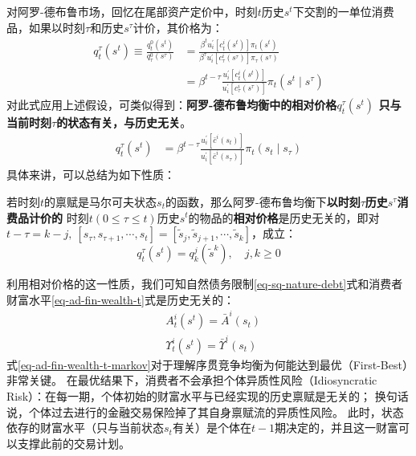 对阿罗-德布鲁市场，回忆在尾部资产定价中，时刻$t$历史$s^t$下交割的一单位消费品，如果以时刻$\tau$和历史$s^{\tau}$计价，其价格为：
\begin{equation*}
    \begin{aligned}
        q_t^\tau\left(s^t\right) 
            \equiv \frac{q_t^0\left(s^t\right)}{q_\tau^0\left(s^\tau\right)} 
            & =\frac{\beta^t u_i^{\prime}\left[c_t^i\left(s^t\right)\right] \pi_t\left(s^t\right)}
                {\beta^\tau u_i^{\prime}\left[c_\tau^i\left(s^\tau\right)\right] \pi_\tau\left(s^\tau\right)} \\
            & =\beta^{t-\tau} \frac{u_i^{\prime}\left[c_t^i\left(s^t\right)\right]}
                {u_i^{\prime}\left[c_\tau^i\left(s^\tau\right)\right]} \pi_t\left(s^t \mid s^\tau\right)
        \end{aligned}
\end{equation*}
对此式应用上述假设，可类似得到：\textbf{阿罗-德布鲁均衡中的相对价格$q_t^\tau\left(s^t\right)$
只与当前时刻$\tau$的状态有关，与历史无关}。
\begin{equation}
    \begin{aligned}
        q_t^{\tau}\left(s^t\right) &= \beta^{t-\tau} \frac{u_i^{\prime}\left[\bar{c}^i\left(s_t\right)\right]}
            {u_i^{\prime}\left[\bar{c}^i\left(s_{\tau}\right)\right]} \pi_t\left(s_t \mid s_{\tau}\right)
    \end{aligned}
\end{equation}
具体来讲，可以总结为如下性质：
\begin{property}
    若时刻$t$的禀赋是马尔可夫状态$s_t$的函数，那么阿罗-德布鲁均衡下\textbf{以时刻$\tau$历史$s^{\tau}$消费品计价的}
    时刻$t\left(0\leq \tau \leq t\right)$历史$s^t$的物品的\textbf{相对价格}是历史无关的，即对
    $t-\tau = k-j, ~ \left[s_{\tau},s_{\tau+1},\cdots,s_t\right] 
        = \left[\tilde{s}_j,\tilde{s}_{j+1},\cdots,\tilde{s}_k\right]$，成立：
    \begin{equation*}
        q_t^{\tau}\left(s^t\right) = q_k^j\left(\tilde{s}^k\right), \quad j,k\geq 0
    \end{equation*}
\end{property}

利用相对价格的这一性质，我们可知自然债务限制\ref{eq-sq-nature-debt}式和消费者财富水平\ref{eq-ad-fin-wealth-t}式是历史无关的：
\begin{align}
    & A_t^i\left(s^t\right)=\bar{A}^i\left(s_t\right) \\
    & \Upsilon_t^i\left(s^t\right)=\bar{\Upsilon}^i\left(s_t\right) \label{eq-ad-fin-wealth-t-markov}
\end{align}
式\ref{eq-ad-fin-wealth-t-markov}对于理解序贯竞争均衡为何能达到最优（First-Best）非常关键。
在最优结果下，消费者不会承担个体异质性风险（Idiosyncratic Risk）：在每一期，个体初始的财富水平与已经实现的历史禀赋是无关的；
换句话说，个体过去进行的金融交易保险掉了其自身禀赋流的异质性风险。
此时，状态依存的财富水平（只与当前状态$s_t$有关）是个体在$t-1$期决定的，并且这一财富可以支撑此前的交易计划。

